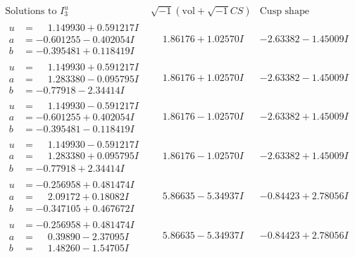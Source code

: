 \documentclass[1p]{elsarticle_modified}
\theoremstyle{definition}
\newcommand{\I}{\sqrt{-1}}
\begin{document}
$$\begin{array}{c|c|c}  
\text{Solutions to }I^u_{3}& \I (\text{vol} + \sqrt{-1}CS) & \text{Cusp shape}\\
 \hline 
\begin{aligned}
u &= \phantom{-}1.149930 + 0.591217 I \\
a &= -0.601255 - 0.402054 I \\
b &= -0.395481 + 0.118419 I\end{aligned}
 & \phantom{-}1.86176 + 1.02570 I & -2.63382 - 1.45009 I \\ \hline\begin{aligned}
u &= \phantom{-}1.149930 + 0.591217 I \\
a &= \phantom{-}1.283380 - 0.095795 I \\
b &= -0.77918 - 2.34414 I\end{aligned}
 & \phantom{-}1.86176 + 1.02570 I & -2.63382 - 1.45009 I \\ \hline\begin{aligned}
u &= \phantom{-}1.149930 - 0.591217 I \\
a &= -0.601255 + 0.402054 I \\
b &= -0.395481 - 0.118419 I\end{aligned}
 & \phantom{-}1.86176 - 1.02570 I & -2.63382 + 1.45009 I \\ \hline\begin{aligned}
u &= \phantom{-}1.149930 - 0.591217 I \\
a &= \phantom{-}1.283380 + 0.095795 I \\
b &= -0.77918 + 2.34414 I\end{aligned}
 & \phantom{-}1.86176 - 1.02570 I & -2.63382 + 1.45009 I \\ \hline\begin{aligned}
u &= -0.256958 + 0.481474 I \\
a &= \phantom{-}2.09172 + 0.18082 I \\
b &= -0.347105 + 0.467672 I\end{aligned}
 & \phantom{-}5.86635 - 5.34937 I & -0.84423 + 2.78056 I \\ \hline\begin{aligned}
u &= -0.256958 + 0.481474 I \\
a &= \phantom{-}0.39890 - 2.37095 I \\
b &= \phantom{-}1.48260 - 1.54705 I\end{aligned}
 & \phantom{-}5.86635 - 5.34937 I & -0.84423 + 2.78056 I \\ \hline\begin{aligned}

\end{aligned}
\end{array}$$
\end{document}
